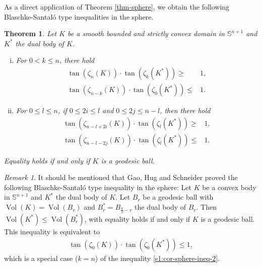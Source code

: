 \documentclass[11pt,reqno]{amsart}
\newtheorem{thm}{Theorem}[section]
\theoremstyle{definition}
\theoremstyle{remark}
\newtheorem{rem}{Remark}
\numberwithin{equation}{section}
\renewcommand{\(}{\left(}
\renewcommand{\)}{\right)}
\renewcommand{\~}{\tilde}
\renewcommand{\-}{\overline}
\newcommand{\Vol}{\operatorname{Vol}}
\begin{document}
As a direct application of Theorem \ref{thm-sphere}, we obtain the following Blaschke-Santal\'o type inequalities in the sphere.
\begin{thm}\label{cor-BS-ineq-sphere-extension}
	Let $K$ be a smooth bounded and strictly convex domain in $\mathbb S^{n+1}$ and $K^\ast$ the dual body of $K$. 
	\begin{enumerate}[(i)]
		\item For $0<k\leq n$, there hold
	\begin{align}
	\tan\(\zeta_n(K)\)\cdot \tan\(\zeta_k(K^\ast)\) \geq& 1,    \label{s1:cor-sphere-ineq-1}\\
	\tan\(\zeta_{n-k}(K)\) \cdot \tan\(\zeta_0(K^\ast)\)\leq & 1. \label{s1:cor-sphere-ineq-2}  
	\end{align}
        \item For $0\leq l\leq n$, if $0\leq 2i\leq l$ and $0\leq 2j\leq n-l$, then there hold
	\begin{align}
	\tan\(\zeta_{n-l+2i}(K)\)\cdot \tan\(\zeta_l(K^\ast)\) \geq& 1, \label{s1:cor-sphere-ineq-3} \\ \tan\(\zeta_{n-l-2j}(K)\)\cdot\tan\(\zeta_l(K^\ast)\) \leq& 1. \label{s1:cor-sphere-ineq-4}
	\end{align}
\end{enumerate}
	Equality holds if and only if $K$ is a geodesic ball. 
\end{thm}
\begin{rem}
	It should be mentioned that Gao, Hug and Schneider \cite[P. 166]{GHS03} proved the following Blaschke-Santal\'o type inequality in the sphere: Let $K$ be a convex body in $\mathbb S^{n+1}$ and $K^\ast$ the dual body of $K$. Let $B_r$ be a geodesic ball with $\Vol(K)=\Vol(B_r)$ and $B_r^\ast=B_{\frac{\pi}{2}-r}$ the dual body of $B_r$. Then $\Vol(K^\ast)\leq \Vol(B_r^\ast)$, with equality holds if and only if $K$ is a geodesic ball. This inequality is equivalent to
    \begin{align*}
    \tan\(\zeta_0(K)\) \cdot \tan(\zeta_0(K^\ast)) \leq 1,
    \end{align*}
    which is a special case ($k=n$) of the inequality \eqref{s1:cor-sphere-ineq-2}.
\end{rem}
\end{document}
